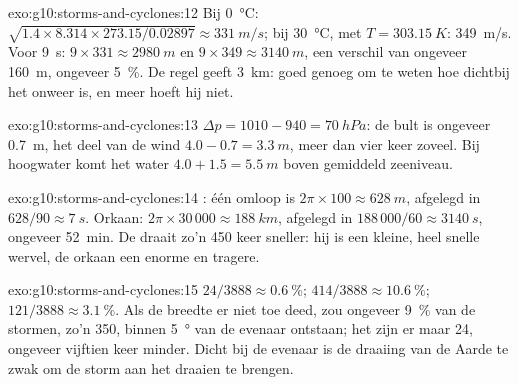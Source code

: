 \begin{solution}{exo:g10:storms-and-cyclones:12}
Bij \qty{0}{\degreeCelsius}: $\sqrt{1.4 \times 8.314 \times 273.15/0.02897}
\approx \qty{331}{m/s}$; bij \qty{30}{\degreeCelsius}, met $T =
\qty{303.15}{K}$: \qty{349}{m/s}. Voor \qty{9}{s}: $9 \times 331 \approx
\qty{2980}{m}$ en $9 \times 349 \approx \qty{3140}{m}$, een verschil van
ongeveer \qty{160}{m}, ongeveer \qty{5}{\percent}. De regel geeft \qty{3}{km}:
goed genoeg om te weten hoe dichtbij het onweer is, en meer hoeft hij niet.
\end{solution}

\begin{solution}{exo:g10:storms-and-cyclones:13}
$\Delta p = 1010 - 940 = \qty{70}{hPa}$: de bult is ongeveer \qty{0.7}{m}, het
deel van de wind $4.0 - 0.7 = \qty{3.3}{m}$, meer dan vier keer zoveel. Bij
hoogwater komt het water $4.0 + 1.5 = \qty{5.5}{m}$ boven gemiddeld zeeniveau.
\end{solution}

\begin{solution}{exo:g10:storms-and-cyclones:14}
: één omloop is $2\pi \times 100 \approx \qty{628}{m}$, afgelegd in
$628/90 \approx \qty{7}{s}$. Orkaan: $2\pi \times 30\,000 \approx
\qty{188}{km}$, afgelegd in $188\,000/60 \approx \qty{3140}{s}$, ongeveer
\qty{52}{min}. De  draait zo'n 450 keer sneller: hij is een kleine, heel
snelle wervel, de orkaan een enorme en tragere.
\end{solution}

\begin{solution}{exo:g10:storms-and-cyclones:15}
$24/3888 \approx \qty{0.6}{\percent}$; $414/3888 \approx
\qty{10.6}{\percent}$; $121/3888 \approx \qty{3.1}{\percent}$. Als de breedte er
niet toe deed, zou ongeveer \qty{9}{\percent} van de stormen, zo'n 350, binnen
\qty{5}{\degree} van de evenaar ontstaan; het zijn er maar 24, ongeveer vijftien
keer minder. Dicht bij de evenaar is de draaiing van de Aarde te zwak om de
storm aan het draaien te brengen.
\end{solution}

